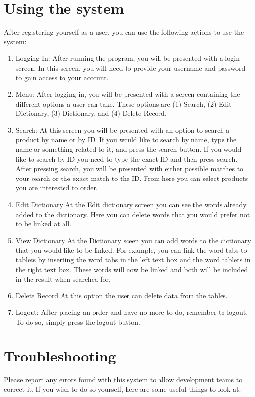 \documentclass[a4paper,10pt]{article}
\begin{document}
\section{Using the system}
	After registering yourself as a user, you can use the following actions to use the system:
	\begin{enumerate}
	\item Logging In:
		After running the program, you will be presented with a login screen.  In this screen, you will need to provide your username and password to gain access to your account.
	\item Menu:
		After logging in, you will be presented with a screen containing the different options a user can take. These options are (1) Search, (2) Edit Dictionary, (3) Dictionary, and (4) Delete Record.

	\item Search:
		At this screen you will be presented with an option to search a product by name or by ID. If you would like to search by name, type the name or something related to it, and press the search button. If you would like to search by ID you need to type the exact ID and then press search.  After pressing search, you will be presented with either possible matches to your search or the exact match to the ID.  From here you can select products you are interested to order.
	\item Edit Dictionary
		At the Edit dictionary screen you can see the words already added to the dictionary. Here you can delete words that you would prefer not to be linked at all.
	\item View Dictionary
		At the Dictionary sceen you can add words to the dictionary that you would like to be linked. For example, you can link the word tabs to tablets by inserting the word tabs in the left text box and the word tablets in the right text box. These words will now be linked and both will be included in the result when searched for. 
	\item Delete Record
		At this option the user can delete data from the tables. 
	\item Logout:
		After placing an order and have no more to do, remember to logout. To do so, simply press the logout button.\\
	\end{enumerate}
\section{Troubleshooting}
	Please report any errors found with this system to allow development teams to correct it. If you wish to do so yourself, here are some useful things to look at:
\end{document}
